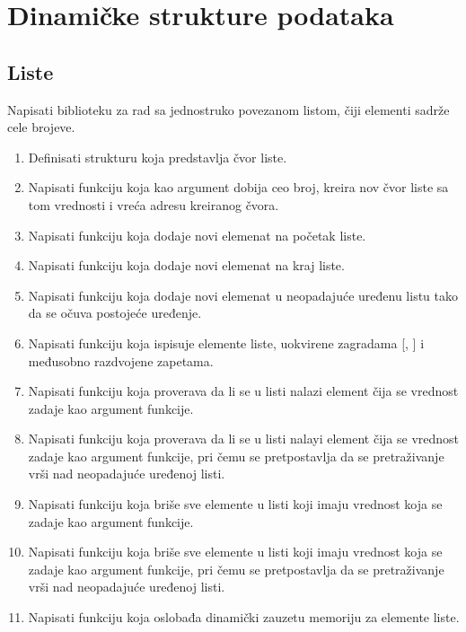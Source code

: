 
\chapter{Dinamičke strukture podataka}

\section{Liste}

\begin{Exercise}[label=601]
Napisati biblioteku za rad sa jednostruko povezanom listom, čiji elementi sadrže cele brojeve. 
\begin{enumerate}
\item Definisati strukturu  koja predstavlja čvor liste.
\item Napisati funkciju koja kao argument dobija ceo broj, kreira nov čvor liste sa tom vrednosti i vreća adresu kreiranog čvora.
 \item Napisati funkciju koja dodaje novi elemenat na početak liste. 
 \item Napisati funkciju koja dodaje novi elemenat na kraj liste. 
 \item Napisati funkciju koja dodaje novi elemenat u neopadajuće uređenu listu tako da se očuva postojeće uređenje.
 \item Napisati funkciju koja ispisuje elemente liste, uokvirene zagradama [, ] i međusobno razdvojene zapetama.
 \item Napisati funkciju koja proverava da li se u listi nalazi element čija se vrednost zadaje kao argument funkcije. 
 \item Napisati funkciju koja proverava da li se u listi nalayi element čija se vrednost zadaje kao argument funkcije, pri čemu se pretpostavlja da se pretraživanje vrši nad neopadajuće uređenoj listi.
 \item Napisati funkciju koja briše sve elemente u listi koji imaju vrednost koja  se zadaje kao argument funkcije.
 \item Napisati funkciju koja briše sve elemente u listi koji imaju vrednost koja  se zadaje kao argument funkcije, pri čemu se pretpostavlja da se pretraživanje vrši nad neopadajuće uređenoj listi.
 \item Napisati funkciju koja oslobađa dinamički zauzetu memoriju za elemente liste.
 \end{enumerate}


\end{Exercise}
